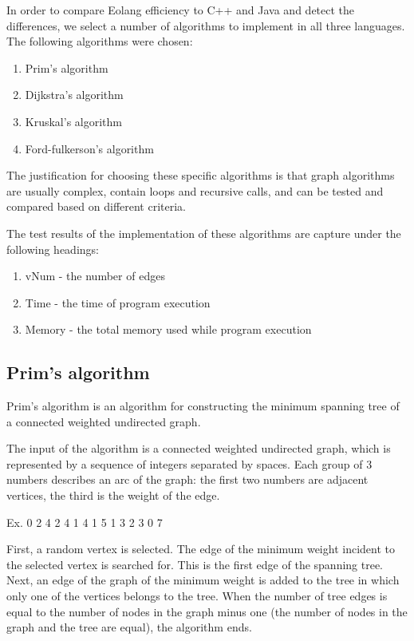 \documentclass[12pt]{book}
\begin{document}
In order to compare Eolang efficiency to C++ and Java and detect the differences, we select a number of algorithms to implement in all three languages. The following algorithms were chosen:
\begin{enumerate}
    \item Prim's algorithm
    \item Dijkstra's algorithm
    \item Kruskal's algorithm
    \item Ford-fulkerson's algorithm
\end{enumerate}

The justification for choosing these specific algorithms is that graph algorithms are usually complex, contain loops and recursive calls, and can be tested and compared based on different criteria. 

The test results of the implementation of these algorithms are capture under the following headings:

\begin{enumerate}
    \item vNum - the number of edges
    \item Time - the time of program execution
    \item Memory - the total memory used while program execution
\end{enumerate}

\subsection{Prim's algorithm}
Prim's algorithm is an algorithm for constructing the minimum spanning tree of a connected weighted undirected graph.

The input of the algorithm is a connected weighted undirected graph, which is represented by a sequence of integers separated by spaces.
Each group of 3 numbers describes an arc of the graph: the first two numbers are adjacent vertices, the third is the weight of the edge. 

Ex. 0 2 4 2 4 1 4 1 5 1 3 2 3 0 7

First, a random vertex is selected. The edge of the minimum weight incident to the selected vertex is searched for. This is the first edge of the spanning tree.
Next, an edge of the graph of the minimum weight is added to the tree in which only one of the vertices belongs to the tree.
When the number of tree edges is equal to the number of nodes in the graph minus one (the number of nodes in the graph and the tree are equal), the algorithm ends.
\end{document}
